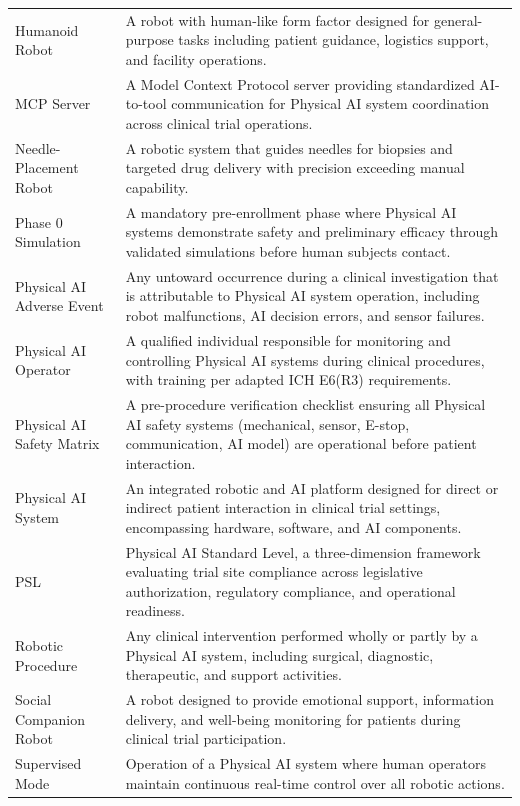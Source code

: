 \begin{longtable}{>{\raggedright\arraybackslash}p{4.5cm} >{\raggedright\arraybackslash}p{11cm}}
Humanoid Robot & A robot with human-like form factor designed for general-purpose tasks including patient guidance, logistics support, and facility operations. \\
MCP Server & A Model Context Protocol server providing standardized AI-to-tool communication for Physical AI system coordination across clinical trial operations. \\
Needle-Placement Robot & A robotic system that guides needles for biopsies and targeted drug delivery with precision exceeding manual capability. \\
Phase 0 Simulation & A mandatory pre-enrollment phase where Physical AI systems demonstrate safety and preliminary efficacy through validated simulations before human subjects contact. \\
Physical AI Adverse Event & Any untoward occurrence during a clinical investigation that is attributable to Physical AI system operation, including robot malfunctions, AI decision errors, and sensor failures. \\
Physical AI Operator & A qualified individual responsible for monitoring and controlling Physical AI systems during clinical procedures, with training per adapted ICH E6(R3) requirements. \\
Physical AI Safety Matrix & A pre-procedure verification checklist ensuring all Physical AI safety systems (mechanical, sensor, E-stop, communication, AI model) are operational before patient interaction. \\
Physical AI System & An integrated robotic and AI platform designed for direct or indirect patient interaction in clinical trial settings, encompassing hardware, software, and AI components. \\
PSL & Physical AI Standard Level, a three-dimension framework evaluating trial site compliance across legislative authorization, regulatory compliance, and operational readiness. \\
Robotic Procedure & Any clinical intervention performed wholly or partly by a Physical AI system, including surgical, diagnostic, therapeutic, and support activities. \\
Social Companion Robot & A robot designed to provide emotional support, information delivery, and well-being monitoring for patients during clinical trial participation. \\
Supervised Mode & Operation of a Physical AI system where human operators maintain continuous real-time control over all robotic actions. \\

\end{longtable}
